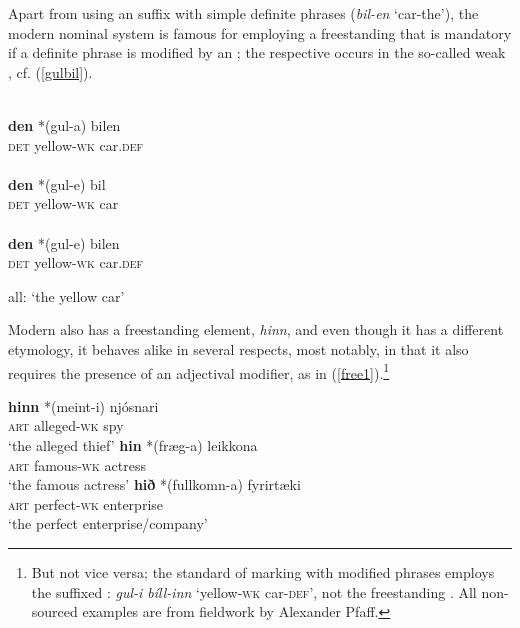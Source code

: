 \documentclass[output=paper,colorlinks,citecolor=brown]{langscibook}
\begin{document}
Apart from using an  suffix with simple definite  phrases (\textit{bil-en} `car-the'), the modern  nominal system is famous for employing a freestanding  that is mandatory if a definite  phrase is modified by an ; the respective  occurs in the so-called weak , cf. (\ref{gulbil}). 


\begin{exe}
  \ex \label{gulbil}
    \begin{xlist}
      \ex {} \\
      \gll  \textbf{den} *(gul-a) bilen   \\ 
      \textsc{det}  \phantom{*}yellow-\textsc{wk} car.\textsc{def}   \\ 
      \ex {} \\ 
      \gll \textbf{den} *(gul-e) bil     \\
      \textsc{det}  \phantom{*}yellow-\textsc{wk}   {car}   \\ 
      \ex {} \\ 
      \gll  \textbf{den} *(gul-e) bilen    \\ 
      \textsc{det} \phantom{*}yellow-\textsc{wk}  car.\textsc{def}   \\ 
    \end{xlist}  
    \glt all: `the yellow car'
\end{exe}  

\begin{sloppypar}
Modern  also has a freestanding  element, \textit{hinn}, and even though it has a different etymology, it behaves alike in several respects, most notably, in that it also requires the presence of an adjectival modifier, as in (\ref{free1}).\footnote{\label{standP}But not vice versa; the standard  of  marking with modified  phrases employs the suffixed : \textit{gul-i bíll-inn} `yellow-\textsc{wk} car-\textsc{def}', not the freestanding . All non-sourced  examples are from fieldwork by Alexander Pfaff. } 
\end{sloppypar}

\begin{exe}
  \ex  \label{free1}  
    \begin{xlist}
      \ex\gll \textbf{hinn} *(meint-i) njósnari  \\ 
      \textsc{art}  \phantom{*}alleged-\textsc{wk}  spy   \\ 
      \glt `the alleged thief' 
      \ex\gll  \textbf{hin} *(fræg-a) leikkona  \\ 
      \textsc{art}  \phantom{*}famous-\textsc{wk}  actress   \\
      \glt `the famous actress' 
      \ex \gll \textbf{hið} *(fullkomn-a) fyrirtæki  \\ 
      \textsc{art} \phantom{*}perfect-\textsc{wk} enterprise   \\
      \glt `the perfect enterprise/company' 
    \end{xlist}  
\end{exe}
\end{document}
